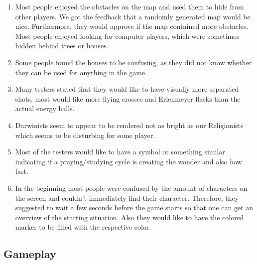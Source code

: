 \documentclass[11pt,a4paper,titlepage,table]{article}
\begin{document}
	\begin{enumerate}
\item Most people enjoyed the obstacles on the map and used them to hide from other players. We got the feedback that a randomly generated map would be nice. Furthermore, they would approve if the map contained more obstacles. Most people enjoyed looking for computer players, which were sometimes hidden behind trees or houses.
\item Some people found the houses to be confusing, as they did not know whether they can be used for anything in the game.
\item Many testers stated that they would like to have visually more separated shots, most would like more flying crosses and Erlenmeyer flasks than the actual energy balls.
\item Darwinists seem to appear to be rendered not as bright as our Religionists which seems to be disturbing for some player.
\item Most of the testers would like to have a symbol or something similar indicating if a praying/studying cycle is creating the wonder and also how fast.
\item In the beginning most people were confused by the amount of characters on the screen and couldn't immediately find their character. Therefore, they suggested to wait a few seconds before the game starts so that one can get an overview of the starting situation. Also they would like to have the colored marker to be filled with the respective color.
\end{enumerate}
	\subsection{Gameplay}
	
\end{document}

